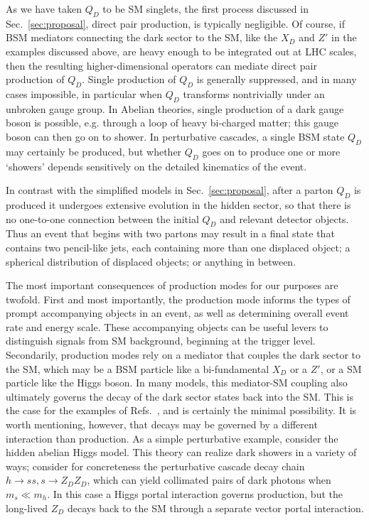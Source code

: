 \begin{enumerate}
As we have taken $Q_D$ to be SM singlets, the first process discussed in Sec.~\ref{sec:proposal}, direct pair production, is typically negligible. Of course, if BSM mediators connecting the dark sector to the SM, like the $X_D$ and $Z'$ in the examples discussed above, are heavy enough to be integrated out at LHC scales, then the resulting higher-dimensional operators can mediate direct pair production of $Q_D$. Single production of $Q_D$ is generally suppressed, and in many cases impossible, in particular when $Q_D$ transforms nontrivially under an unbroken gauge group. In Abelian theories, single production of a dark gauge boson is possible, e.g. through a loop of heavy bi-charged matter; this gauge boson can then go on to shower. In perturbative cascades, a single BSM state $Q_D$ may certainly be produced, but whether $Q_D$ goes on to produce one or more `showers' depends sensitively on the detailed kinematics of the event.

In contrast with the simplified models in Sec.~\ref{sec:proposal}, after a parton $Q_D$ is produced it undergoes extensive evolution in the hidden sector, so that there is no one-to-one connection between the initial $Q_D$ and relevant detector objects. Thus an event that begins with two partons may result in a final state that contains two pencil-like jets, each containing more than one displaced object; a spherical distribution of displaced objects; or anything in between.

The most important consequences of production modes for our purposes are twofold. First and most importantly, the production mode informs the types of prompt accompanying objects in an event, as well as determining overall event rate and energy scale. These accompanying objects can be useful levers to distinguish signals from SM background, beginning at the trigger level. Secondarily, production modes rely on a mediator that couples the dark sector to the SM, which may be a BSM particle like a bi-fundamental $X_D$ or a $Z'$, or a SM particle like the Higgs boson. In many models, this mediator-SM coupling also ultimately governs the decay of the dark sector states back into the SM. This is the case for the examples of Refs.~\cite{Schwaller:2015gea,Strassler:2006ri,Strassler:2006im,Han:2007ae,Cohen:2015toa,Renner:2018fhh,Craig:2015pha,Craig:2016kue,Curtin:2015fna}, and is certainly the minimal possibility. It is worth mentioning, however, that decays may be governed by a different interaction than production.  As a simple perturbative example, consider the hidden abelian Higgs model. This theory can realize dark showers in a variety of ways; consider for concreteness the perturbative cascade decay chain $h\to ss, s \to Z_D Z_D$, which can yield collimated pairs of dark photons when $m_s\ll m_h$. In this case a Higgs portal interaction governs production, but the long-lived $Z_D$ decays back to the SM through a separate vector portal interaction.


\end{enumerate}
